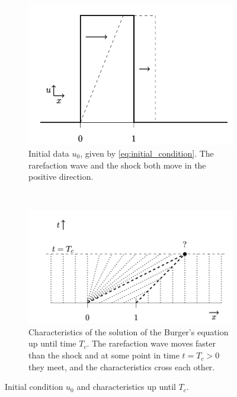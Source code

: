 \documentclass[10pt,letterpaper]{article}
\theoremstyle{break}
\begin{document}
\begin{solution}
    \begin{figure}
        \centering
        \begin{subfigure}[b]{0.5\textwidth}
            \includegraphics[width=\textwidth]{figures02/ex_set_2_3} 
            \caption{Initial data $u_0$, given by \eqref{eq:initial_condition}.
            The rarefaction wave and the shock both move in the positive direction.}
            \label{fig:u_0}
        \end{subfigure}
        ~
        \begin{subfigure}[b]{0.5\textwidth}
            \includegraphics[width=\textwidth]{figures02/ex_set_2_2} 
            \caption{Characteristics of the solution of the Burger's equation
            up until time $T_c$. The rarefaction wave moves faster than
            the shock and at some point in time $t = T_c > 0$ they meet,
            and the characteristics cross each other.}
            \label{fig:characteritics}
        \end{subfigure}
        \caption{Initial condition $u_0$ and characteristics up until $T_c$.}
        \label{problem3_part1}
    \end{figure}
    

\end{solution}
\end{document}
